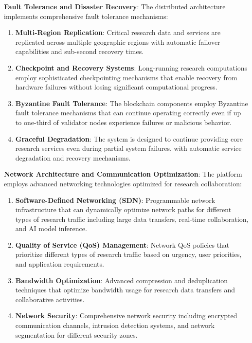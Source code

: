 \documentclass[10pt,twocolumn]{article}
\begin{document}
\textbf{Fault Tolerance and Disaster Recovery}: The distributed architecture implements comprehensive fault tolerance mechanisms:

\begin{enumerate}
    \item \textbf{Multi-Region Replication}: Critical research data and services are replicated across multiple geographic regions with automatic failover capabilities and sub-second recovery times.
    
    \item \textbf{Checkpoint and Recovery Systems}: Long-running research computations employ sophisticated checkpointing mechanisms that enable recovery from hardware failures without losing significant computational progress.
    
    \item \textbf{Byzantine Fault Tolerance}: The blockchain components employ Byzantine fault tolerance mechanisms that can continue operating correctly even if up to one-third of validator nodes experience failures or malicious behavior.
    
    \item \textbf{Graceful Degradation}: The system is designed to continue providing core research services even during partial system failures, with automatic service degradation and recovery mechanisms.
\end{enumerate}

\textbf{Network Architecture and Communication Optimization}: The platform employs advanced networking technologies optimized for research collaboration:

\begin{enumerate}
    \item \textbf{Software-Defined Networking (SDN)}: Programmable network infrastructure that can dynamically optimize network paths for different types of research traffic including large data transfers, real-time collaboration, and AI model inference.
    
    \item \textbf{Quality of Service (QoS) Management}: Network QoS policies that prioritize different types of research traffic based on urgency, user priorities, and application requirements.
    
    \item \textbf{Bandwidth Optimization}: Advanced compression and deduplication techniques that optimize bandwidth usage for research data transfers and collaborative activities.
    
    \item \textbf{Network Security}: Comprehensive network security including encrypted communication channels, intrusion detection systems, and network segmentation for different security zones.
\end{enumerate}
\end{document}
